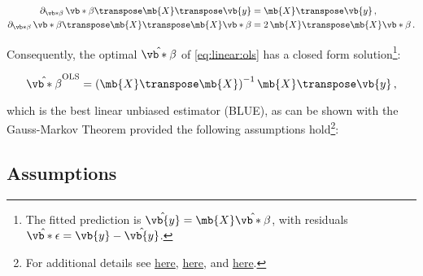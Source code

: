 \begin{subequations} \label{eq:grad_relations}
\begin{align}
\partial_{\vb*{\beta}} \, \vb*{\beta}\transpose \mb{X}\transpose \vb{y} &= \mb{X}\transpose \vb{y}\,, \label{eq:grad_relations:1} \\
\partial_{\vb*{\beta}} \, \vb*{\beta}\transpose \mb{X}\transpose \mb{X} \vb*{\beta} &= 2 \, \mb{X}\transpose \mb{X} \vb*{\beta}\,. \label{eq:grad_relations:2}
\end{align}
\end{subequations}

Consequently, the optimal $\hat{\vb*{\beta}}$ of \cref{eq:linear:ols}
has a closed form solution\footnote{The fitted prediction is $\hat{\vb{y}} = \mb{X} \hat{\vb*{\beta}}$, with residuals $\hat{\vb*{\epsilon}} = \vb{y} - \hat{\vb{y}}$.}:

\begin{equation}\label{eq:linear:betahat_OLS}
\hat{\vb*{\beta}}^{\text{OLS}} = \left(\mb{X}\transpose\mb{X}\right)^{-1}\mb{X}\transpose \vb{y}\,,
\end{equation}

\noindent which is the best linear unbiased estimator (BLUE),
as can be shown with the Gauss-Markov Theorem provided
the following assumptions hold\footnote{For additional details see
\href{https://economictheoryblog.com/2015/04/01/ols_assumptions/}{here},
\href{http://people.duke.edu/~rnau/testing.htm}{here}, and
\href{https://economictheoryblog.com/2015/02/26/markov_theorem/}{here}.}:

\subsection{Assumptions}
\label{regression:linear:assumptions}

